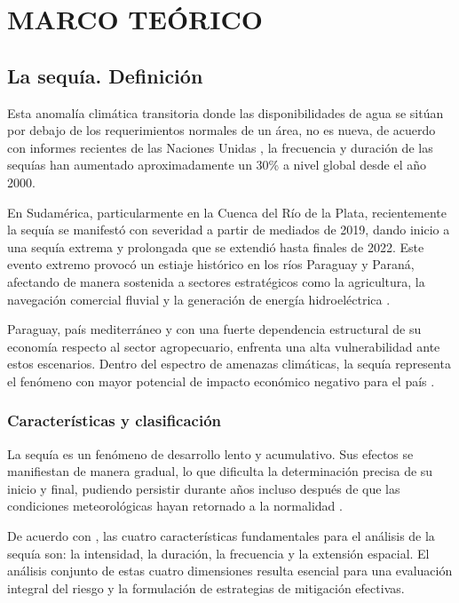 \chapter{MARCO TEÓRICO}

\section{La sequía. Definición}

Esta anomalía climática transitoria donde las disponibilidades de agua se sitúan por debajo de los requerimientos normales de un área, no es nueva, de acuerdo con informes recientes de las Naciones Unidas \cite{tsegai2022}, la frecuencia y duración de las sequías han aumentado aproximadamente un 30\% a nivel global desde el año 2000.

En Sudamérica, particularmente en la Cuenca del Río de la Plata, recientemente la sequía se manifestó con severidad a partir de mediados de 2019, dando inicio a una sequía extrema y prolongada que se extendió hasta finales de 2022. Este evento extremo provocó un estiaje histórico en los ríos Paraguay y Paraná, afectando de manera sostenida a sectores estratégicos como la agricultura, la navegación comercial fluvial y la generación de energía hidroeléctrica \cite{naumann2023}.

Paraguay, país mediterráneo y con una fuerte dependencia estructural de su economía respecto al sector agropecuario, enfrenta una alta vulnerabilidad ante estos escenarios. Dentro del espectro de amenazas climáticas, la sequía representa el fenómeno con mayor potencial de impacto económico negativo para el país \cite{cepal2014}.

\subsection{Características y clasificación}

La sequía es un fenómeno de desarrollo lento y acumulativo. Sus efectos se manifiestan de manera gradual, lo que dificulta la determinación precisa de su inicio y final, pudiendo persistir durante años incluso después de que las condiciones meteorológicas hayan retornado a la normalidad \cite{mishra2010}.

De acuerdo con , las cuatro características fundamentales para el análisis de la sequía son: la intensidad, la duración, la frecuencia y la extensión espacial. El análisis conjunto de estas cuatro dimensiones resulta esencial para una evaluación integral del riesgo y la formulación de estrategias de mitigación efectivas.


